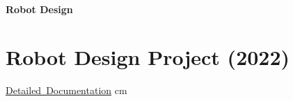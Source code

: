 \documentclass[10pt, letterpaper]{article}
\let\hrefWithoutArrow\href
\renewcommand{\href}[2]{\hrefWithoutArrow{#1}{\ifthenelse{\equal{#2}{}}{ }{#2 }\raisebox{.15ex}{\footnotesize \faExternalLink*}}}
\begin{document}

    \newpage
    {\fontsize{30pt}{30pt} \textbf{Robot Design}} %
    
    \vspace{0.3cm}
    
    \section{Robot Design Project (2022)}

    \normalsize
    \mbox{\hrefWithoutArrow{https://github.com/liu092111/College_Portfolio/blob/71e4be464adb2a4c50174f57073b5a7411a3f80e/Mechanical\%20Project/Robot\%20Design_Final\%20Report.pdf}{{\footnotesize\faLink}\hspace*{0.13cm}Detailed Documentation}}%
     cm%
    
\end{document}
